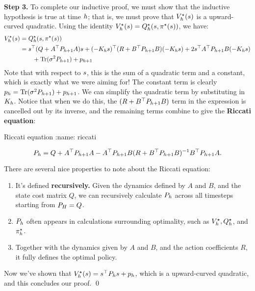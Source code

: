\documentclass[\main/main]{subfiles}
\begin{document}
\textbf{Step 3.} To complete our inductive proof, we must show that the
inductive hypothesis is true at time $h$; that is, we must prove that
$V^\star_h(s)$ is a upward-curved quadratic.
Using the identity $V^\star_h(s) = Q^\star_h(s, \pi^\star(s))$, we have: \begin{align*}
    V^\star_h(s) & = Q^\star_h(s, \pi^\star(s))                                                                \\
                     & = s^\top (Q + A^\top P_{h+1} A) s + (-K_h s)^\top (R + B^\top P_{h+1} B) (-K_h s)
    + 2s^\top A^\top P_{h+1} B (-K_h s)                                                                          \\
                     & \qquad + \operatorname*{\textrm{Tr}}(\sigma^2 P_{h+1}) + p_{h+1}
\end{align*}
Note that with respect to $s$, this is the sum of a quadratic term and a constant,
which is exactly what we were aiming for!
The constant term is clearly $p_h = \operatorname*{\textrm{Tr}}(\sigma^2 P_{h+1}) + p_{h+1}$.
We can simplify the quadratic term by substituting in $K_h$.
Notice that when we do this, the $(R+B^\top P_{h+1} B)$ term in
the expression is cancelled out by its inverse, and the remaining terms combine to give the \textbf{Riccati equation}:

\begin{definition}{Riccati equation}
:name: riccati

    \[
        P_h = Q + A^\top P_{h+1} A - A^\top P_{h+1} B (R + B^\top P_{h+1} B)^{-1} B^\top P_{h+1} A.
    \]
\end{definition}

There are several nice properties to note about the Riccati equation:
\begin{enumerate}
    \item It's defined \textbf{recursively.} Given the dynamics defined by $A$ and $B$, and the state cost matrix $Q$, we can
          recursively calculate $P_h$ across all timesteps starting from $P_H = Q$.
    \item $P_h$ often appears in calculations surrounding optimality, such as $V^\star_h, Q^\star_h$, and $\pi^\star_h$.
    \item Together with the dynamics given by $A$ and $B$, and the action coefficients $R$, it fully defines the optimal policy.
\end{enumerate}

Now we've shown that $V^\star_h(s) = s^\top P_h s + p_h$, which is a upward-curved quadratic, and this concludes our proof. \qed
\end{document}
